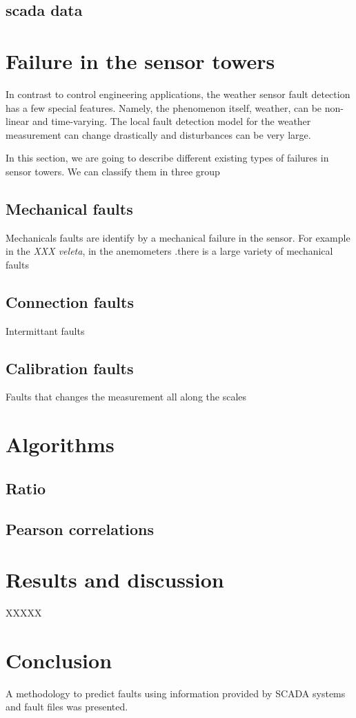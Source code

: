 \documentclass[journal]{IEEEtran}
\begin{document}
\subsection{scada data}\label{subsec:scadaData}

\section{Failure in the sensor towers}\label{sec:failures}
In contrast to control engineering applications, the weather sensor fault detection has a few special features. Namely, the phenomenon itself, weather, can be non-linear and time-varying. The local fault detection model for the weather measurement can change drastically and disturbances can be very large.


In this section, we are going to describe different existing types of failures in sensor towers. We can classify them in three group
\subsection{Mechanical faults} Mechanicals faults are identify by a mechanical failure in the sensor. For example in the \emph{XXX veleta}, 
in the anemometers .there is a large variety of mechanical faults
\subsection{Connection  faults} Intermittant faults
\subsection{Calibration faults} Faults that changes the measurement all along the scales


\section{Algorithms}\label{sec:algorithms}
\subsection{Ratio}
\subsection{Pearson correlations}
\section{Results and discussion}\label{sec:results}
XXXXX
\section{Conclusion}\label{sec:conclusion}
A methodology to predict  faults using information provided by SCADA systems and fault files was presented.



\end{document}
